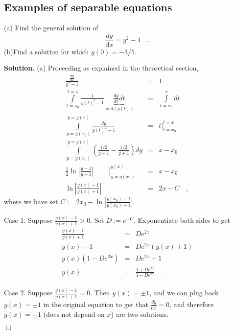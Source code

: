 \documentclass[12pt]{book}
\newcommand{\diff}{\text{d}}
\newenvironment{solution}{\textbf{Solution.} }{$\Box$}
\begin{document}
\subsection{Examples of separable equations}
(a) Find the general solution of
\[
\frac{dy}{\diff x}= y^2-1\quad .
\]
(b)Find a solution for which $y(0)=-3/5$.

\begin{solution}
(a) Proceeding as explained in the theoretical section,
\[
\begin{array}{rcl}
\frac{\frac{dy}{\diff x}}{y^2-1}&=&1 \\
\displaystyle\int\limits_{t=x_0}^{t=x} \frac{1}{ y(t)^2-1}\underbrace{\frac{dy}{dt}dt}_{=d(y(t))}&=&\displaystyle\int\limits_{t=x_0}^{x}dt \\
\displaystyle\int\limits_{y=y(x_0) }^{y=y(x)} \frac{dy}{ y(t)^2-1}& =& \displaystyle\left.t \right|_{ t=x_0}^{t=x} \\
\displaystyle\int\limits_{y=y(x_0)}^{y=y(x)} \left(\frac{1/2 }{y-1}- \frac{1/2}{y+1}\right)dy&=& x-x_0\\
\displaystyle\left .\frac{1}2 \ln \left|\frac{y-1}{y+1}\right|~~~~~~~~~~\right|_{y=y(x_0)}^{y(x)}&=& x-x_0\\
\displaystyle\ln \left|\frac{y(x)-1}{y(x)+1}\right|&=& 2x - C\quad ,
\end{array}
\]
where we have set $C:=2x_0-  \ln \left|\frac{y(x_0)-1}{y(x_0)+1}\right|$. 

Case 1. Suppose $\frac{y(x)-1}{y(x)+1}>0$. Set $D:=e^{-C}$. Exponentiate both sides to get 
\[
\begin{array}{rcl}
\frac{y(x)-1}{y(x)+1}&=& D e^{2x}\\
y(x)-1&=& De^{2x}(y(x)+1)\\
y(x)(1- De^{2x})&=& De^{2x}+1\\
y(x)&=&\frac{ 1+De^{2x}}{1- De^{2x}}\quad .\\
\end{array}
\]

Case 2.  Suppose $\frac{y(x)-1}{y(x)+1}=0$. Then $y(x)=\pm 1$, and we can plug back $y(x)=\pm 1$ in the original equation to get that $\frac{dy}{\diff x}= 0$, and therefore $y(x)= \pm 1$ (does not depend on $x$) are two solutions.


\end{solution}
\end{document}
